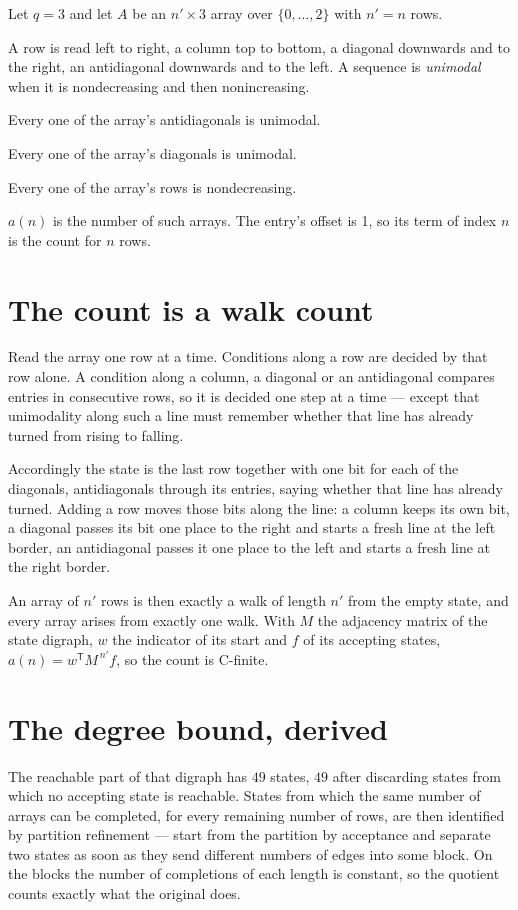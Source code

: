 \documentclass[11pt]{article}
\theoremstyle{definition}
\begin{document}
Let $q = 3$ and let $A$ be an $n' \times 3$ array over $\{0,\dots,2\}$ with $n' = n$ rows.

A row is read left to right, a column top to bottom, a diagonal downwards and to the right, an antidiagonal downwards and to the left. A sequence is {\itshape unimodal} when it is nondecreasing and then nonincreasing.

Every one of the array's antidiagonals is unimodal.

Every one of the array's diagonals is unimodal.

Every one of the array's rows is nondecreasing.

$a(n)$ is the number of such arrays. The entry's offset is 1, so its term of index $n$ is the count for $n$ rows.

\section{The count is a walk count}

Read the array one row at a time. Conditions along a row are decided by that row alone. A condition along a column, a diagonal or an antidiagonal compares entries in consecutive rows, so it is decided one step at a time --- except that unimodality along such a line must remember whether that line has already turned from rising to falling.

Accordingly the state is the last row together with one bit for each of the diagonals, antidiagonals through its entries, saying whether that line has already turned. Adding a row moves those bits along the line: a column keeps its own bit, a diagonal passes its bit one place to the right and starts a fresh line at the left border, an antidiagonal passes it one place to the left and starts a fresh line at the right border.

An array of $n'$ rows is then exactly a walk of length $n'$ from the empty state, and every array arises from exactly one walk. With $M$ the adjacency matrix of the state digraph, $w$ the indicator of its start and $f$ of its accepting states, $a(n) = w^{\mathsf T}M^{\,n'}f$, so the count is C-finite.

\section{The degree bound, derived}

The reachable part of that digraph has $49$ states, $49$ after discarding states from which no accepting state is reachable. States from which the same number of arrays can be completed, for every remaining number of rows, are then identified by partition refinement --- start from the partition by acceptance and separate two states as soon as they send different numbers of edges into some block. On the blocks the number of completions of each length is constant, so the quotient counts exactly what the original does.
\end{document}
